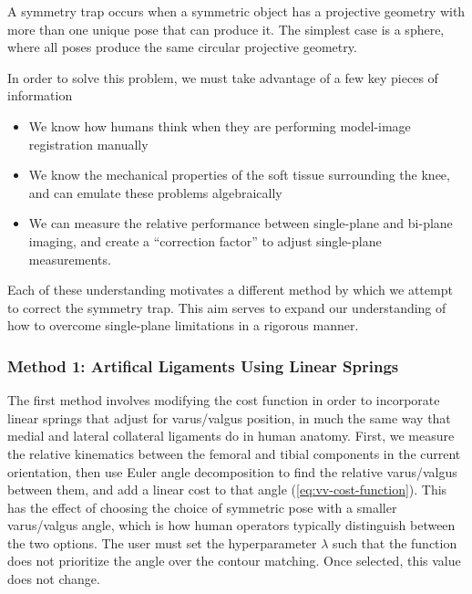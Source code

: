 \begin{mdframed}
    \begin{definition}
        A symmetry trap occurs when a symmetric object has a projective geometry with more than one unique pose that can produce it. The simplest case is a sphere, where all poses produce the same circular projective geometry.
    \end{definition}
\end{mdframed}

In order to solve this problem, we must take advantage of a few key pieces of information

\begin{itemize}
    \item We know how humans think when they are performing model-image registration manually
    \item We know the mechanical properties of the soft tissue surrounding the knee, and can emulate these problems algebraically
    \item We can measure the relative performance between single-plane and bi-plane imaging, and create a ``correction factor'' to adjust single-plane measurements.
\end{itemize}

Each of these understanding motivates a different method by which we attempt to correct the symmetry trap. This aim serves to expand our understanding of how to overcome single-plane limitations in a rigorous manner.

\subsubsection{Method 1: Artifical Ligaments Using Linear Springs}
The first method involves modifying the cost function in order to incorporate linear springs that adjust for varus/valgus position, in much the same way that medial and lateral collateral ligaments do in human anatomy. First, we measure the relative kinematics between the femoral and tibial components in the current orientation, then use Euler angle decomposition to find the relative varus/valgus between them, and add a linear cost to that angle (\cref{eq:vv-cost-function}). This has the effect of choosing the choice of symmetric pose with a smaller varus/valgus angle, which is how human operators typically distinguish between the two options. The user must set the hyperparameter $\lambda$ such that the function does not prioritize the angle over the contour matching. Once selected, this value does not change.


